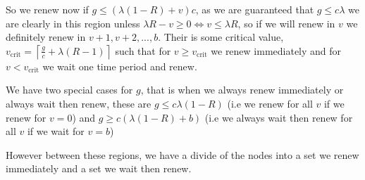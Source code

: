 \documentclass[a4paper,10pt]{article}
\newcommand{\ceil}[1]{\left \lceil #1 \right \rceil}
\theoremstyle{definition}
\theoremstyle{definition}
\theoremstyle{remark}
\theoremstyle{definition}
\begin{document}
So we renew now if $g \leq (\lambda(1-R)+v)c$, as we are guaranteed that $g \leq c \lambda$ we are clearly in this region unless $\lambda R-v \geq 0 \iff v \leq \lambda R $, so if we will renew in $v$ we definitely renew in $v+1,v+2,...,b$. Their is some critical value, $v_{\text{crit}}=\ceil{\frac{g}{c}+ \lambda (R-1)}$ such that for $v \geq v_{\text{crit}}$ we renew immediately and for $v < v_{\text{crit}}$ we wait one time period and renew.

We have two special cases for $g$, that is when we always renew immediately or always wait then renew, these are $g \leq  c \lambda(1-R)$ (i.e we renew for all $v$ if we renew for $v=0$) and $g \geq c (\lambda(1-R)+b)$ (i.e we always wait then renew for all $v$ if we wait for $v=b$)

However between these regions, we have a divide of the nodes into a set we renew immediately and a set we wait then renew.
\end{document}
